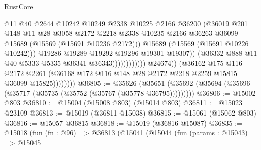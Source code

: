 \begin{lexlean}{RustCore}
\begin{coremodule}
                                                @11
                                                @40
                                                @2644
                                                @10242
                                                @10249
                                                @2338
                                                @10225
                                                @2166
                                                @36200
                                                (@36019
                                                  @201
                                                  @148
                                                  @11
                                                  @28
                                                  @3058
                                                  @2172
                                                  @2218
                                                  @2338
                                                  @10235
                                                  @2166
                                                  @36263
                                                  @36099
                                                  @15689
                                                  (@15569 (@15691 @10236 @2172)))
                                                @15689
                                                (@15569 (@15691 @10226 @10242)))
                                              @19286
                                              @19289
                                              @19292
                                              @19296
                                              @19301
                                              @19307))
                                          (@36332 @888 @11 @40 @5333 @5335 @36341 @36343))))))))))))
                    @24674))
                (@36162
                  @175
                  @116
                  @2172
                  @2261
                  (@36168 @172 @116 @148 @28 @2172 @2218 @2259 @15815 @36099 @15825))))))))
@36805 := @35626
    (@35651 (@35692 (@35694 (@35696 (@35717 (@35735 (@35752 (@35767 (@35778 @36795)))))))))
@36806 := @15002 @803
@36810 := @15004 (@15008 @803) (@15014 @803)
@36811 := @15023 @23109
@36813 := @15019 (@36811 @15038)
@36815 := @15061 (@15062 @803)
@36816 := @15057 @36815
@36818 := @15019 (@36816 @15087)
@36835 := @15018
    (fun (fn : @96) =>
    @36813
      (@15041
        (@15044
          (fun (params : @15043) =>
          @15045

\end{coremodule}
\end{lexlean}
